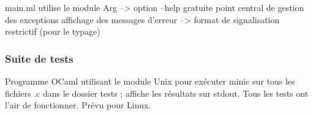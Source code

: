 \documentclass[a4paper, 11pt]{article}
\begin{document}
main.ml
utilise le module Arg --> option --help gratuite
point central de gestion des exceptions
affichage des messages d'erreur
--> format de signalisation restrictif (pour le typage)

\subsubsection{Suite de tests}

Programme OCaml utilisant le module Unix pour exécuter minic sur tous les fichiers .c
dans le dossier tests ; affiche les résultats sur stdout.
Tous les tests ont l'air de fonctionner.
Prévu pour Linux.
\end{document}
